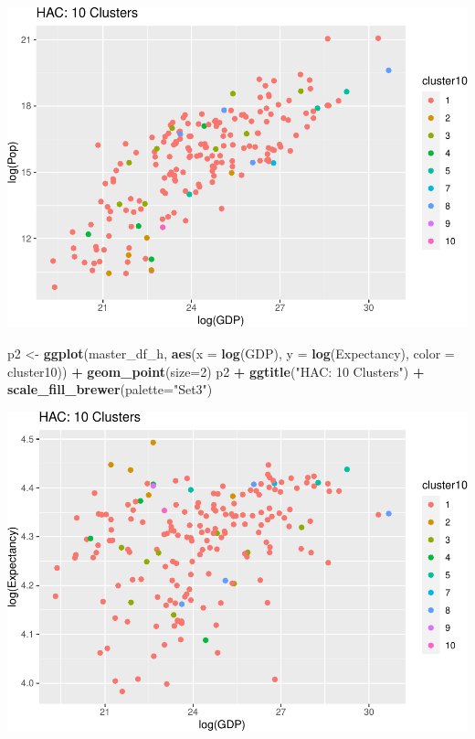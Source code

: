 \documentclass[]{article}
\newenvironment{Shaded}{\begin{snugshade}}{\end{snugshade}}
\newcommand{\DataTypeTok}[1]{\textcolor[rgb]{0.13,0.29,0.53}{#1}}
\newcommand{\DecValTok}[1]{\textcolor[rgb]{0.00,0.00,0.81}{#1}}
\newcommand{\KeywordTok}[1]{\textcolor[rgb]{0.13,0.29,0.53}{\textbf{#1}}}
\newcommand{\NormalTok}[1]{#1}
\newcommand{\OperatorTok}[1]{\textcolor[rgb]{0.81,0.36,0.00}{\textbf{#1}}}
\newcommand{\StringTok}[1]{\textcolor[rgb]{0.31,0.60,0.02}{#1}}
\begin{document}
\includegraphics{eda_files/figure-latex/unnamed-chunk-31-1.pdf}

\begin{Shaded}
\begin{Highlighting}[]
\NormalTok{p2 <-}\StringTok{ }\KeywordTok{ggplot}\NormalTok{(master_df_h, }\KeywordTok{aes}\NormalTok{(}\DataTypeTok{x =} \KeywordTok{log}\NormalTok{(GDP), }\DataTypeTok{y =} \KeywordTok{log}\NormalTok{(Expectancy), }\DataTypeTok{color =}\NormalTok{ cluster10)) }\OperatorTok{+}
\StringTok{  }\KeywordTok{geom_point}\NormalTok{(}\DataTypeTok{size=}\DecValTok{2}\NormalTok{)}
\NormalTok{p2 }\OperatorTok{+}\StringTok{ }\KeywordTok{ggtitle}\NormalTok{(}\StringTok{"HAC: 10 Clusters"}\NormalTok{) }\OperatorTok{+}\StringTok{ }\KeywordTok{scale_fill_brewer}\NormalTok{(}\DataTypeTok{palette=}\StringTok{"Set3"}\NormalTok{)}
\end{Highlighting}
\end{Shaded}

\includegraphics{eda_files/figure-latex/unnamed-chunk-31-2.pdf}
\end{document}
